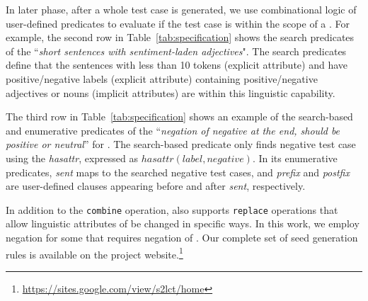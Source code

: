
In later phase, after a whole test case is generated, we use combinational logic of 
user-defined predicates to evaluate if the test case is within the scope of a \lc. 
For example, the second row in Table~\ref{tab:specification} shows the search predicates of the \lc ``\emph{short sentences with sentiment-laden adjectives}". The search predicates define that the sentences with less than 10 tokens (explicit attribute) and have positive/negative labels (explicit attribute) containing positive/negative adjectives or nouns (implicit attributes) are within this linguistic capability.




The third row in Table~\ref{tab:specification} shows an example of the  search-based and enumerative predicates of the \lc ``\emph{negation of negative at the end, should be positive or neutral}'' for \sa. The search-based predicate only finds negative test case using the \emph{hasattr}, expressed as $hasattr(label,negative)$.
In its enumerative predicates, \emph{sent} maps to the searched negative test cases, and \emph{prefix} and \emph{postfix} are user-defined clauses appearing before and after \emph{sent}, respectively.

In addition to the \texttt{combine} operation, \tool also supports \texttt{replace} operations that allow linguistic attributes of \phs be changed in specific ways. 
In this work, we employ negation for some \lcs that requires negation of \sents. Our complete set of seed generation rules is available on the project website.\footnote{\href{https://sites.google.com/view/s2lct/home}{https://sites.google.com/view/s2lct/home}} 

